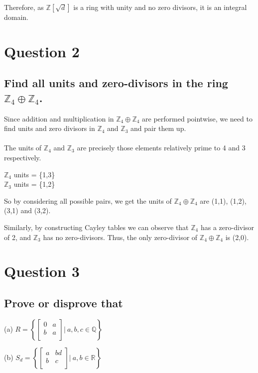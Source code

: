 \documentclass{article}
\begin{document}
Therefore, as \(\mathds{Z}[\sqrt{d}]\) is a ring with unity and no zero divisors, it is an integral domain.
\section*{Question 2}
\subsection*{Find all units and zero-divisors in the ring \(\mathds{Z}_4 \oplus \mathds{Z}_4\).}

\solution
Since addition and multiplication in \(\mathds{Z}_4 \oplus \mathds{Z}_4\) are performed pointwise, we need to find units and zero divisors in \(\mathds{Z}_4\) and \(\mathds{Z}_3\) and pair them up.
\\\\
The units of \(\mathds{Z}_4\) and \(\mathds{Z}_3\) are precisely those elements relatively prime to 4 and 3 respectively.

\hspace* \(\mathds{Z}_4\) units = \{1,3\}\\
\hspace* \(\mathds{Z}_3\) units = \{1,2\}

So by considering all possible pairs, we get the units of \(\mathds{Z}_4 \oplus \mathds{Z}_4\) are (1,1), (1,2), (3,1) and (3,2).

Similarly, by constructing Cayley tables we can observe that \(\mathds{Z}_4\) has a zero-divisor of 2, and \(\mathds{Z}_3\) has no zero-divisors. Thus, the only zero-divisor of \(\mathds{Z}_4 \oplus \mathds{Z}_4\) is (2,0).

\pagebreak
\section*{Question 3}
\subsection*{Prove or disprove that}

(a) \(R = \left\{
  \left[ {\begin{array}{cc}
   0 & a \\
   b & a \\
  \end{array} } \right] \rvert\: a,b,c \in \mathds{Q} \right\}
\)

(b) \(S_d = \left\{
  \left[ {\begin{array}{cc}
   a & bd \\
   b & c \\
  \end{array} } \right] \rvert\: a,b \in \mathds{R} \right\}
\)
\end{document}
